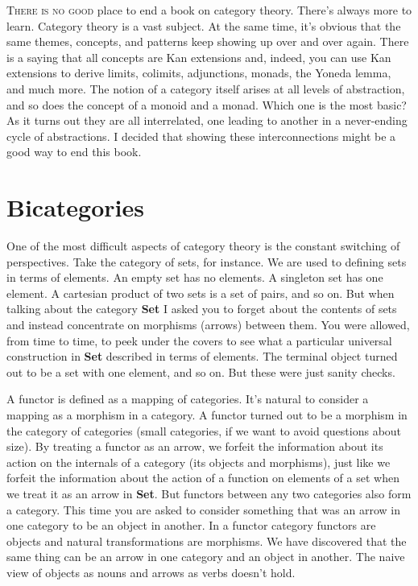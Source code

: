 \lettrine[lhang=0.17]{T}{here is no good} place to end a book on category theory. There's always
more to learn. Category theory is a vast subject. At the same time, it's
obvious that the same themes, concepts, and patterns keep showing up
over and over again. There is a saying that all concepts are Kan
extensions and, indeed, you can use Kan extensions to derive limits,
colimits, adjunctions, monads, the Yoneda lemma, and much more. The
notion of a category itself arises at all levels of abstraction, and so
does the concept of a monoid and a monad. Which one is the most basic?
As it turns out they are all interrelated, one leading to another in a
never-ending cycle of abstractions. I decided that showing these
interconnections might be a good way to end this book.

\section{Bicategories}\label{bicategories}

One of the most difficult aspects of category theory is the constant
switching of perspectives. Take the category of sets, for instance. We
are used to defining sets in terms of elements. An empty set has no
elements. A singleton set has one element. A cartesian product of two
sets is a set of pairs, and so on. But when talking about the category
\textbf{Set} I asked you to forget about the contents of sets and
instead concentrate on morphisms (arrows) between them. You were
allowed, from time to time, to peek under the covers to see what a
particular universal construction in \textbf{Set} described in terms of
elements. The terminal object turned out to be a set with one element,
and so on. But these were just sanity checks.

A functor is defined as a mapping of categories. It's natural to
consider a mapping as a morphism in a category. A functor turned out to
be a morphism in the category of categories (small categories, if we
want to avoid questions about size). By treating a functor as an arrow,
we forfeit the information about its action on the internals of a
category (its objects and morphisms), just like we forfeit the
information about the action of a function on elements of a set when we
treat it as an arrow in \textbf{Set}. But functors between any two
categories also form a category. This time you are asked to consider
something that was an arrow in one category to be an object in another.
In a functor category functors are objects and natural transformations
are morphisms. We have discovered that the same thing can be an arrow in
one category and an object in another. The naive view of objects as
nouns and arrows as verbs doesn't hold.

